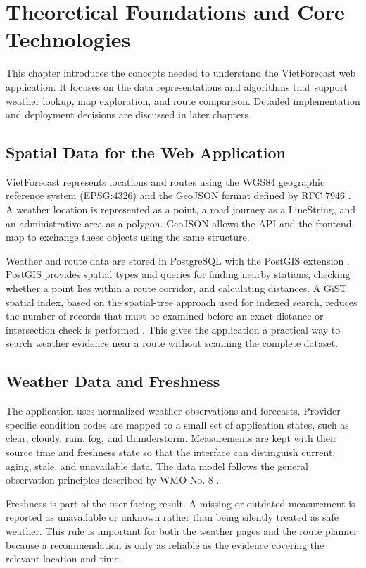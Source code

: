 \chapter{Theoretical Foundations and Core Technologies}
\label{ch:theory}

This chapter introduces the concepts needed to understand the VietForecast web application. It focuses on the data representations and algorithms that support weather lookup, map exploration, and route comparison. Detailed implementation and deployment decisions are discussed in later chapters.

\section{Spatial Data for the Web Application}
VietForecast represents locations and routes using the WGS84 geographic reference system (EPSG:4326) and the GeoJSON format defined by RFC 7946 \cite{rfc7946}. A weather location is represented as a point, a road journey as a LineString, and an administrative area as a polygon. GeoJSON allows the API and the frontend map to exchange these objects using the same structure.

Weather and route data are stored in PostgreSQL with the PostGIS extension \cite{postgis2023}. PostGIS provides spatial types and queries for finding nearby stations, checking whether a point lies within a route corridor, and calculating distances. A GiST spatial index, based on the spatial-tree approach used for indexed search, reduces the number of records that must be examined before an exact distance or intersection check is performed \cite{guttman1984}. This gives the application a practical way to search weather evidence near a route without scanning the complete dataset.

\section{Weather Data and Freshness}
The application uses normalized weather observations and forecasts. Provider-specific condition codes are mapped to a small set of application states, such as clear, cloudy, rain, fog, and thunderstorm. Measurements are kept with their source time and freshness state so that the interface can distinguish current, aging, stale, and unavailable data. The data model follows the general observation principles described by WMO-No. 8 \cite{wmo2021guidelines}.

Freshness is part of the user-facing result. A missing or outdated measurement is reported as unavailable or unknown rather than being silently treated as safe weather. This rule is important for both the weather pages and the route planner because a recommendation is only as reliable as the evidence covering the relevant location and time.

